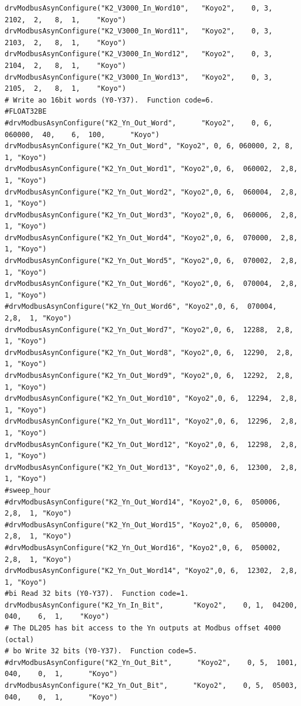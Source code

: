 \documentclass[11pt
  , a4paper
  , article
  , oneside
]{memoir}
\begin{document}
\begin{lstlisting}[style=termstyle]
drvModbusAsynConfigure("K2_V3000_In_Word10",   "Koyo2",    0, 3,  2102,  2,   8,  1,    "Koyo")
drvModbusAsynConfigure("K2_V3000_In_Word11",   "Koyo2",    0, 3,  2103,  2,   8,  1,    "Koyo")
drvModbusAsynConfigure("K2_V3000_In_Word12",   "Koyo2",    0, 3,  2104,  2,   8,  1,    "Koyo")
drvModbusAsynConfigure("K2_V3000_In_Word13",   "Koyo2",    0, 3,  2105,  2,   8,  1,    "Koyo")
# Write ao 16bit words (Y0-Y37).  Function code=6.
#FLOAT32BE
#drvModbusAsynConfigure("K2_Yn_Out_Word",      "Koyo2",    0, 6,  060000,  40,    6,  100,      "Koyo")
drvModbusAsynConfigure("K2_Yn_Out_Word", "Koyo2", 0, 6, 060000, 2, 8, 1, "Koyo")
drvModbusAsynConfigure("K2_Yn_Out_Word1", "Koyo2",0, 6,  060002,  2,8,  1, "Koyo")
drvModbusAsynConfigure("K2_Yn_Out_Word2", "Koyo2",0, 6,  060004,  2,8,  1, "Koyo")
drvModbusAsynConfigure("K2_Yn_Out_Word3", "Koyo2",0, 6,  060006,  2,8,  1, "Koyo")
drvModbusAsynConfigure("K2_Yn_Out_Word4", "Koyo2",0, 6,  070000,  2,8,  1, "Koyo")
drvModbusAsynConfigure("K2_Yn_Out_Word5", "Koyo2",0, 6,  070002,  2,8,  1, "Koyo")
drvModbusAsynConfigure("K2_Yn_Out_Word6", "Koyo2",0, 6,  070004,  2,8,  1, "Koyo")
#drvModbusAsynConfigure("K2_Yn_Out_Word6", "Koyo2",0, 6,  070004,  2,8,  1, "Koyo")
drvModbusAsynConfigure("K2_Yn_Out_Word7", "Koyo2",0, 6,  12288,  2,8,  1, "Koyo")
drvModbusAsynConfigure("K2_Yn_Out_Word8", "Koyo2",0, 6,  12290,  2,8,  1, "Koyo")
drvModbusAsynConfigure("K2_Yn_Out_Word9", "Koyo2",0, 6,  12292,  2,8,  1, "Koyo")
drvModbusAsynConfigure("K2_Yn_Out_Word10", "Koyo2",0, 6,  12294,  2,8,  1, "Koyo")
drvModbusAsynConfigure("K2_Yn_Out_Word11", "Koyo2",0, 6,  12296,  2,8,  1, "Koyo")
drvModbusAsynConfigure("K2_Yn_Out_Word12", "Koyo2",0, 6,  12298,  2,8,  1, "Koyo")
drvModbusAsynConfigure("K2_Yn_Out_Word13", "Koyo2",0, 6,  12300,  2,8,  1, "Koyo")
#sweep_hour
#drvModbusAsynConfigure("K2_Yn_Out_Word14", "Koyo2",0, 6,  050006,  2,8,  1, "Koyo")
#drvModbusAsynConfigure("K2_Yn_Out_Word15", "Koyo2",0, 6,  050000,  2,8,  1, "Koyo")
#drvModbusAsynConfigure("K2_Yn_Out_Word16", "Koyo2",0, 6,  050002,  2,8,  1, "Koyo")
drvModbusAsynConfigure("K2_Yn_Out_Word14", "Koyo2",0, 6,  12302,  2,8,  1, "Koyo")
#bi Read 32 bits (Y0-Y37).  Function code=1.
drvModbusAsynConfigure("K2_Yn_In_Bit",       "Koyo2",    0, 1,  04200,  040,    6,  1,    "Koyo")
# The DL205 has bit access to the Yn outputs at Modbus offset 4000 (octal)
# bo Write 32 bits (Y0-Y37).  Function code=5.
#drvModbusAsynConfigure("K2_Yn_Out_Bit",      "Koyo2",    0, 5,  1001,  040,    0,  1,      "Koyo")
drvModbusAsynConfigure("K2_Yn_Out_Bit",      "Koyo2",    0, 5,  05003,  040,    0,  1,      "Koyo")

\end{lstlisting}
\end{document}
